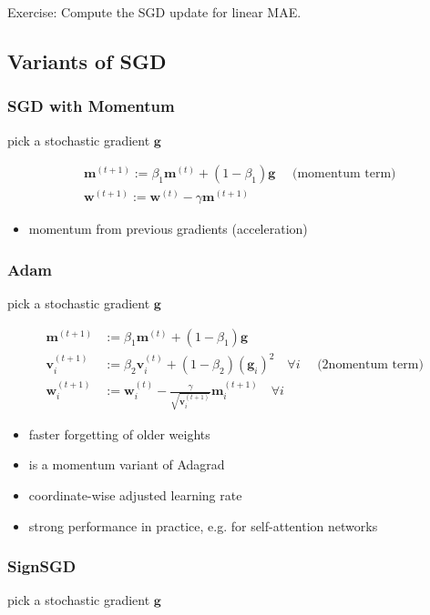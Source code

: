 Exercise: Compute the SGD update for linear MAE.

\subsection*{Variants of SGD}
\subsubsection*{SGD with Momentum}
pick a stochastic gradient $\mathbf{g}$

$$
\begin{aligned}
& \mathbf{m}^{(t+1)}:=\beta_{1} \mathbf{m}^{(t)}+\left(1-\beta_{1}\right) \mathbf{g} \quad \text { (momentum term) } \\
& \mathbf{w}^{(t+1)}:=\mathbf{w}^{(t)}-\gamma \mathbf{m}^{(t+1)}
\end{aligned}
$$

\begin{itemize}
  \item momentum from previous gradients (acceleration)
\end{itemize}

\subsubsection*{Adam}
pick a stochastic gradient $\mathbf{g}$

$$
\begin{aligned}
\mathbf{m}^{(t+1)} & :=\beta_{1} \mathbf{m}^{(t)}+\left(1-\beta_{1}\right) \mathbf{g} \\
\mathbf{v}_{i}^{(t+1)} & :=\beta_{2} \mathbf{v}_{i}^{(t)}+\left(1-\beta_{2}\right)\left(\mathbf{g}_{i}\right)^{2} \quad \forall i \quad \text { (2nomentum term) } \\
\mathbf{w}_{i}^{(t+1)} & :=\mathbf{w}_{i}^{(t)}-\frac{\gamma}{\sqrt{\mathbf{v}_{i}^{(t+1)}}} \mathbf{m}_{i}^{(t+1)} \quad \forall i
\end{aligned}
$$

\begin{itemize}
  \item faster forgetting of older weights
  \item is a momentum variant of Adagrad
  \item coordinate-wise adjusted learning rate
  \item strong performance in practice, e.g. for self-attention networks
\end{itemize}

\subsubsection*{SignSGD}
pick a stochastic gradient $\mathbf{g}$

